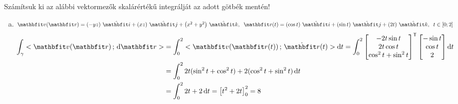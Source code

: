 \documentclass[exercise]{math-standalone}
\begin{document}
\begin{exercise}{Számítsuk ki az alábbi vektormezők skalárértékű integrálját az adott götbék mentén!}
{\begin{enumerate}[a)]
      \item $\rvec v(\rvec r) = \ijk{-yz}{xz}{x^2 + y^2}, \;\; \rvec r(t) = \ijk{\cos t}{\sin t}{2t}, \;\; t \in [0; 2]$
            \begin{align*}
              \int_\gamma \scalar{\rvec v(\rvec r)}{\diff \rvec r}
               & = \int_0^2 \scalar{\rvec v(\rvec r(t))}{\dot{\rvec r}(t)} \diff t
              = \int_0^2
              \begin{bmatrix}
                -2t \sin t \\
                2t \cos t  \\
                \cos^2 t + \sin^2 t
              \end{bmatrix}^\transpose
              \begin{bmatrix}
                - \sin t \\
                \cos t   \\
                2
              \end{bmatrix} \diff t
              \\
               & = \int_0^2 2t ( \sin^2 t + \cos^2 t ) + 2 ( \cos^2 t + \sin^2 t ) \, \diff t
              \\
               & = \int_0^2 2t + 2 \, \diff t
              = \left[ t^2 + 2t \right]_0^2
              = 8
            \end{align*}


\end{enumerate}}
\end{exercise}
\end{document}
